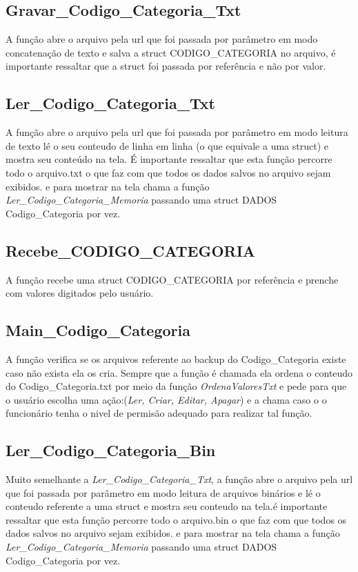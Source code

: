\documentclass{article}
\begin{document}
\subsection{Gravar\_Codigo\_Categoria\_Txt}
	A função abre o arquivo pela url que foi passada por parâmetro em modo concatenação de texto e salva a struct CODIGO\_CATEGORIA  no arquivo, é importante ressaltar que  a struct foi passada por referência e não por valor.

\subsection{Ler\_Codigo\_Categoria\_Txt}
	A função abre o arquivo pela url que foi passada por parâmetro em modo leitura de texto lé o seu conteudo de linha em linha (o que equivale a uma struct) e mostra seu conteúdo na tela. É importante ressaltar que esta função percorre todo o arquivo.txt o que faz com que todos os dados salvos no arquivo sejam exibidos. e para mostrar na tela chama a função \textit{Ler\_Codigo\_Categoria\_Memoria} passando uma struct DADOS Codigo\_Categoria  por vez.

\subsection{Recebe\_CODIGO\_CATEGORIA}
	A função recebe uma struct  CODIGO\_CATEGORIA por referência e prenche com valores digitados pelo usuário.

\subsection{Main\_Codigo\_Categoria}
	A função verifica se os arquivos referente ao backup do Codigo\_Categoria existe caso não exista ela os cria. Sempre que a função é chamada ela ordena o conteudo do Codigo\_Categoria.txt por meio da função \textit{OrdenaValoresTxt} e pede para que o usuário escolha uma ação:(\textit{Ler, Criar, Editar, Apagar})  e a chama caso o  o funcionário tenha o nivel de permisão adequado para realizar tal função.

\subsection{Ler\_Codigo\_Categoria\_Bin}
	Muito semelhante a \textit{Ler\_Codigo\_Categoria\_Txt}, a função abre o arquivo pela url que foi passada por parâmetro em modo leitura de arquivos binários e lé o conteudo referente a uma struct e mostra seu conteudo na tela.é importante ressaltar que esta função percorre todo o arquivo.bin o que faz com que todos os dados salvos no arquivo sejam exibidos. e para mostrar na tela chama a função \textit{Ler\_Codigo\_Categoria\_Memoria} passando uma struct DADOS Codigo\_Categoria  por vez.
\end{document}
